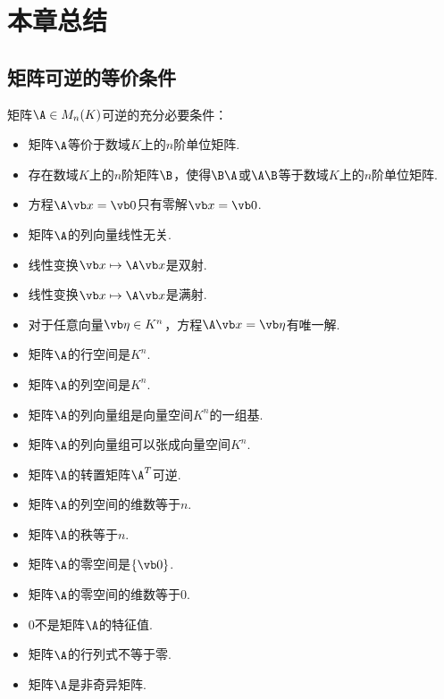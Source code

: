 \section{本章总结}
\subsection*{矩阵可逆的等价条件}
矩阵\(\A \in M_n(K)\)可逆的充分必要条件：\begin{itemize}
	\item 矩阵\(\A\)等价于数域\(K\)上的\(n\)阶单位矩阵.
	\item 存在数域\(K\)上的\(n\)阶矩阵\(\B\)，使得\(\B\A\)或\(\A\B\)等于数域\(K\)上的\(n\)阶单位矩阵.
	\item 方程\(\A\x=\vb0\)只有零解\(\x=\vb0\).
	\item 矩阵\(\A\)的列向量线性无关.
	\item 线性变换\(\x \mapsto \A\x\)是双射.
	\item 线性变换\(\x \mapsto \A\x\)是满射.
	\item 对于任意向量\(\b \in K^n\)，方程\(\A\x=\b\)有唯一解.
	\item 矩阵\(\A\)的行空间是\(K^n\).
	\item 矩阵\(\A\)的列空间是\(K^n\).
	\item 矩阵\(\A\)的列向量组是向量空间\(K^n\)的一组基.
	\item 矩阵\(\A\)的列向量组可以张成向量空间\(K^n\).
	\item 矩阵\(\A\)的转置矩阵\(\A^T\)可逆.
	\item 矩阵\(\A\)的列空间的维数等于\(n\).
	\item 矩阵\(\A\)的秩等于\(n\).
	\item 矩阵\(\A\)的零空间是\(\{\vb0\}\).
	\item 矩阵\(\A\)的零空间的维数等于\(0\).
	\item \(0\)不是矩阵\(\A\)的特征值.
	\item 矩阵\(\A\)的行列式不等于零.
	\item 矩阵\(\A\)是非奇异矩阵.
\end{itemize}


